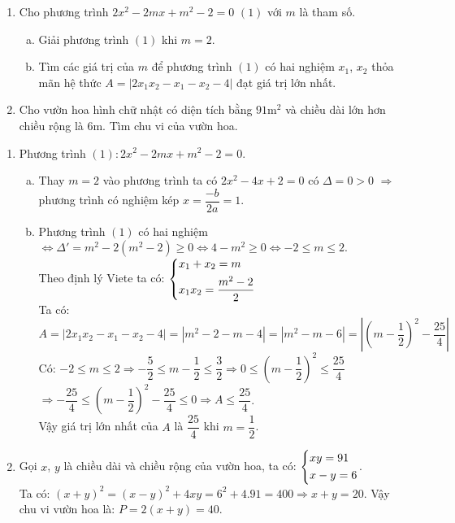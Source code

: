 \begin{ex}%
\hfill
    \begin{enumerate}
        \item  Cho phương trình $2x^2-2mx+m^2-2=0$ $(1)$ với $m$ là tham số.
        \begin{enumerate}[a)]
        	\item Giải phương trình $(1)$ khi  $m=2$.
        	\item Tìm các giá trị của $m$ để phương trình $(1)$ có hai nghiệm $x_1$,  $x_2$ thỏa mãn hệ thức $A=|2x_1x_2-x_1-x_2-4|$ đạt giá trị lớn nhất.
        \end{enumerate}
    	\item Cho vườn hoa hình chữ nhật có diện tích bằng $91\textrm{m}^2$ và chiều dài lớn hơn chiều rộng là $6$m. Tìm chu vi của vườn hoa.
    \end{enumerate}
\loigiai
    {
    \begin{enumerate}
        \item Phương trình $(1):2x^2-2mx+m^2-2=0$.
        \begin{enumerate}[a)]
        	\item Thay $m=2$ vào phương trình ta có $2x^2-4x+2=0$ có $\Delta=0>0$ $\Rightarrow$ phương trình có nghiệm kép  $x=\dfrac{-b}{2a}=1$.
        	\item Phương trình $(1)$ có hai nghiệm $\Leftrightarrow\Delta'=m^2-2(m^2-2)\ge0\Leftrightarrow4-m^2\ge0\Leftrightarrow-2\le m\le2$.\\
        	Theo định lý Viete ta có: $\left\{\begin{aligned}&x_1+x_2=m\\&x_1x_2=\dfrac{m^2-2}{2}\end{aligned}\right.$\\
        	Ta có: $A=|2x_1x_2-x_1-x_2-4|=|m^2-2-m-4|=|m^2-m-6|=\left|\left(m-\dfrac{1}{2}\right)^2-\dfrac{25}{4}\right|$\\
        	Có: $-2\le m\le2\Rightarrow-\dfrac{5}{2}\le m-\dfrac{1}{2}\le\dfrac{3}{2}\Rightarrow0\le\left(m-\dfrac{1}{2}\right)^2\le\dfrac{25}{4}$\\
        	$\Rightarrow-\dfrac{25}{4}\le\left(m-\dfrac{1}{2}\right)^2-\dfrac{25}{4}\le0\Rightarrow A\le\dfrac{25}{4}$.\\
        	Vậy giá trị lớn nhất của $A$ là $\dfrac{25}{4}$ khi $m=\dfrac{1}{2}$.
        \end{enumerate}
        \item Gọi $x$, $y$ là chiều dài và chiều rộng của vườn hoa, ta có: $\left\{\begin{aligned}&xy=91\\&x-y=6\end{aligned}\right.$.\\
        Ta có: $(x+y)^2=(x-y)^2+4xy=6^2+4.91=400\Rightarrow x+y=20$. Vậy chu vi vườn hoa là: $P=2(x+y)=40$.
    \end{enumerate}
    }
\end{ex}

